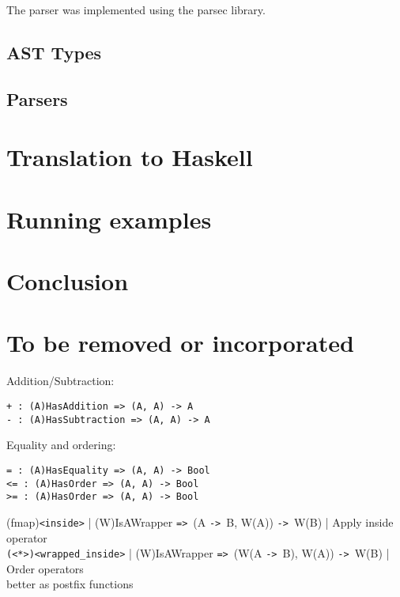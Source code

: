 \documentclass{article}
\def\H{Haskell}
\def\ra{\texttt{->}\ }
\def\Ra{\texttt{=>}\ }
\begin{document}
The parser was implemented using the parsec library.

\subsection{AST Types}

\subsection{Parsers}

\section{Translation to \H}
\section{Running examples}
\section{Conclusion}

\section{To be removed or incorporated}

Addition/Subtraction:
\begin{verbatim}
+ : (A)HasAddition => (A, A) -> A
- : (A)HasSubtraction => (A, A) -> A
\end{verbatim}
Equality and ordering:
\begin{verbatim}
= : (A)HasEquality => (A, A) -> Bool
<= : (A)HasOrder => (A, A) -> Bool
>= : (A)HasOrder => (A, A) -> Bool
\end{verbatim}

(fmap)\texttt{<inside>} | (W)IsAWrapper \Ra (A \ra B, W(A)) \ra W(B) | Apply inside operator \\
\texttt{(<*>)<wrapped_inside>} | (W)IsAWrapper \Ra (W(A \ra B), W(A)) \ra W(B) | Order operators \\

better as postfix functions \\
\hspace{1cm}\\

%
%
%
%

\end{document}
